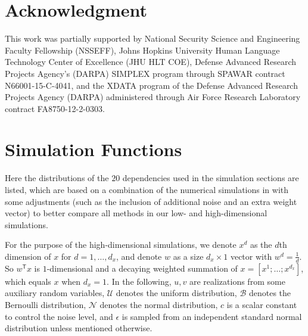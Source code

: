 \documentclass[11pt]{article}
\newcommand{\T}{^{\ensuremath{\mathsf{T}}}}           %
\providecommand{\mc}[1]{\mathcal{#1}}
\begin{document}


\section*{Acknowledgment}
This work was partially supported by 
% 
National Security Science and Engineering Faculty Fellowship (NSSEFF), 
% 
Johns Hopkins University Human Language Technology Center of Excellence (JHU HLT COE), 
% 
Defense Advanced Research Projects Agency's (DARPA) SIMPLEX program through SPAWAR contract N66001-15-C-4041, 
% 
and the XDATA program of the Defense Advanced Research Projects Agency (DARPA) administered through Air Force Research Laboratory contract FA8750-12-2-0303.



\appendix
\setcounter{figure}{0}
\renewcommand\thefigure{A\arabic{figure}} 

\section{Simulation Functions}
\label{appen:function}

Here the distributions of the $20$ dependencies used in the simulation sections are listed, which are based on a combination of the numerical simulations in \cite{SzekelyRizzoBakirov2007, SimonTibshirani2012, SimonTibshirani2012, GorfineHellerHeller2012} with some adjustments (such as the inclusion of additional noise and an extra weight vector) to better compare all methods in our low- and high-dimensional simulations.

For the purpose of the high-dimensional simulations, we denote $x^{d}$ as the $d$th dimension of $x$ for $d=1,\ldots,d_{x}$, and denote $w$ as a size $d_{x} \times 1$ vector with $w^{d}=\frac{1}{d}$. So $w\T x$ is $1$-dimensional and a decaying weighted summation of $x=[x^{1};\ldots;x^{d_{x}}]$, which equals $x$ when $d_{x}=1$. In the following, $u, v$ are realizations from some auxiliary random variables, $\mc{U}$ denotes the uniform distribution, $\mc{B}$ denotes the Bernoulli distribution, $\mc{N}$ denotes the normal distribution, $c$ is a scalar constant to control the noise level, and $\epsilon$ is sampled from an independent standard normal distribution unless mentioned otherwise.
\end{document}
